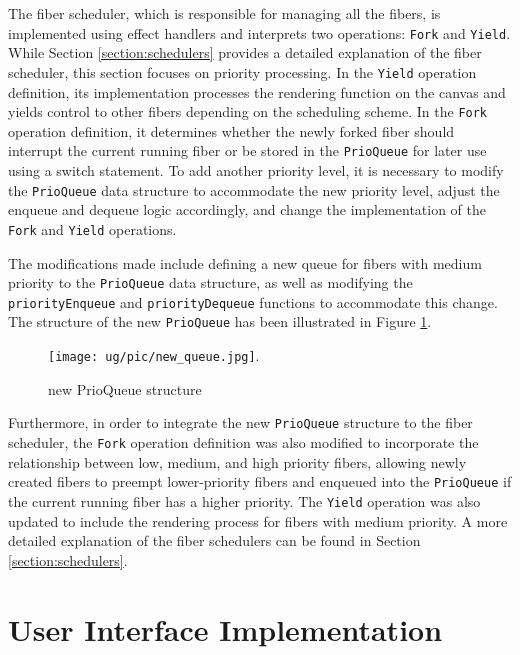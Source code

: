 \documentclass[logo,bsc,singlespacing,parskip]{infthesis}
\begin{document}
The fiber scheduler, which is responsible for managing all the fibers, is implemented using effect handlers and interprets two operations: \texttt{Fork} and \texttt{Yield}.  While Section \ref{section:schedulers} provides a detailed explanation of the fiber scheduler, this section focuses on priority processing. In the \texttt{Yield} operation definition, its implementation processes the rendering function on the canvas and yields control to other fibers depending on the scheduling scheme. In the \texttt{Fork} operation definition, it determines whether the newly forked fiber should interrupt the current running fiber or be stored in the \texttt{PrioQueue} for later use using a switch statement. To add another priority level, it is necessary to modify the \texttt{PrioQueue} data structure to accommodate the new priority level, adjust the enqueue and dequeue logic accordingly, and change the implementation of the \texttt{Fork} and \texttt{Yield} operations.

The modifications made include defining a new queue for fibers with medium priority to the \texttt{PrioQueue} data structure, as well as modifying the \texttt{priorityEnqueue} and \texttt{priorityDequeue} functions to accommodate this change. The structure of the new \texttt{PrioQueue} has been illustrated in Figure \ref{fig:new_queue}.

\begin{figure}[htbp]
    \centering
    \texttt{[image: ug/pic/new\_queue.jpg]}.
    \caption{new PrioQueue structure}
    \label{fig:new_queue}
\end{figure}

Furthermore, in order to integrate the new \texttt{PrioQueue} structure to the fiber scheduler, the \texttt{Fork} operation definition was also modified to incorporate the relationship between low, medium, and high priority fibers, allowing newly created fibers to preempt lower-priority fibers and enqueued into the \texttt{PrioQueue} if the current running fiber has a higher priority. The \texttt{Yield} operation was also updated to include the rendering process for fibers with medium priority. A more detailed explanation of the fiber schedulers can be found in Section \ref{section:schedulers}.

\section{User Interface Implementation}
\label{section:user_interface}
\end{document}
